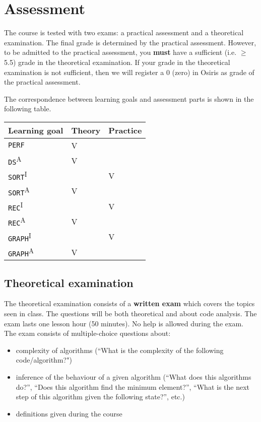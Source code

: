 \section{Assessment}
	The course is tested with two exams: a practical assessment and a theoretical examination. The final grade is determined by the practical assessment. However, to be admitted to the practical assessment, you \textbf{must} have a sufficient (i.e. $\geq$ 5.5) grade in the theoretical examination. If your grade in the theoretical examination is not sufficient, then we will register a 0 (zero) in Osiris as grade of the practical assessment.
	
	The correspondence between learning goals and assessment parts is shown in the following table. \\
	
	\begin{table}[h]
		\centering
	\begin{tabular}{ |l|l|l| }
		\hline
		\textbf{Learning goal} & \textbf{Theory} & \textbf{Practice} \\
		\hline
		\texttt{PERF} & V & \\
		\hline 
		\texttt{DS}\textsuperscript{A} & V & \\
		\hline 
		\texttt{SORT}\textsuperscript{I} & & V \\
		\hline 
		\texttt{SORT}\textsuperscript{A} & V & \\
		\hline 
		\texttt{REC}\textsuperscript{I} & & V \\
		\hline 
		\texttt{REC}\textsuperscript{A} & V &  \\
		\hline 
		\texttt{GRAPH}\textsuperscript{I} & & V \\
		\hline 
		\texttt{GRAPH}\textsuperscript{A} & V & \\
		\hline 
	\end{tabular}
	\end{table}

	\subsection{Theoretical examination}
	The theoretical examination consists of a \textbf{written exam} which covers the topics seen in class. The questions will be both theoretical and about code analysis.
	The exam lasts one lesson hour (50 minutes). No help is allowed during the exam.\\
	
	The exam consists of multiple-choice questions about:
	\begin{itemize}
		\item complexity of algorithms (``What is the complexity of the following code/algorithm?")
		\item inference of the behaviour of a given algorithm (``What does this algorithms do?'', ``Does this algorithm find the minimum element?'', ``What is the next step of this algorithm given the following state?'', etc.)
		\item definitions given during the course
	\end{itemize}

